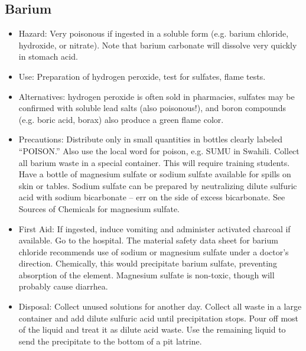 \subsection{Barium}

\begin{itemize}

\item{Hazard: Very poisonous if ingested in a soluble form 
(e.g. barium chloride, hydroxide, or nitrate). 
Note that barium carbonate will dissolve very quickly in stomach acid.}

\item{Use: Preparation of hydrogen peroxide, 
test for sulfates, flame tests.}

\item{Alternatives: hydrogen peroxide is often sold in pharmacies, 
sulfates may be confirmed with soluble lead salts (also poisonous!), 
and boron compounds (e.g. boric acid, borax) 
also produce a green flame color.} 

\item{Precautions: Distribute only in small quantities 
in bottles clearly labeled “POISON.” 
Also use the local word for poison, e.g. SUMU in Swahili. 
Collect all barium waste in a special container. 
This will require training students. 
Have a bottle of magnesium sulfate 
or sodium sulfate available for spills on skin or tables. 
Sodium sulfate can be prepared by neutralizing dilute sulfuric acid 
with sodium bicarbonate – err on the side of excess bicarbonate. 
See Sources of Chemicals for magnesium sulfate.}

\item{First Aid: If ingested, induce vomiting 
and administer activated charcoal if available. 
Go to the hospital. 
The material safety data sheet for barium chloride 
recommends use of sodium or magnesium sulfate under a doctor's direction. 
Chemically, this would precipitate barium sulfate, 
preventing absorption of the element. 
Magnesium sulfate is non-toxic, though will probably cause diarrhea.}

\item{Disposal: Collect unused solutions for another day. 
Collect all waste in a large container 
and add dilute sulfuric acid until precipitation stops. 
Pour off most of the liquid and treat it as dilute acid waste. 
Use the remaining liquid to send the precipitate 
to the bottom of a pit latrine.}

\end{itemize}

